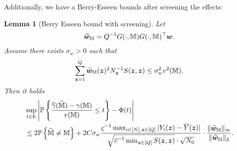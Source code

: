 \documentclass[12pt]{article}
\newtheorem{lemma}{Lemma}
\begin{document}
Additionally, we have a Berry-Esseen bounds after screening the effects:

\begin{lemma}[Berry Esseen bound with  screening]\label{lem:tail-perfect-ms} Let 
\begin{align}\label{eqn:tw}
\widetilde{{\boldsymbol{w}}}_{{\mathbb{M}}} = Q^{-1}G(\cdot,{\mathbb{M}})G(\cdot,{\mathbb{M}})^\top{\boldsymbol{w}}.
\end{align}
Assume there exists $\sigma_w>0$ such that
\begin{align}\label{eqn:nondegenerate-var-tw}
    \sum_{{\boldsymbol{z}}=1}^Q \widetilde{{\boldsymbol{w}}}_{{\mathbb{M}}}({\boldsymbol{z}})^2 N_{{\boldsymbol{z}}}^{-1} S({\boldsymbol{z}},{\boldsymbol{z}}) \le \sigma_w^2 v^2({\mathbb{M}}).
\end{align}
Then it holds
\begin{align}\label{eqn:tail-perfect-ms}
    &\sup_{t\in{\mathbb{R}}}\left|{{\mathbb{P}}\left\{\frac{{\widehat{\gamma}}(\widehat{{\mathbb{M}}})-\gamma({\mathbb{M}})}{v({\mathbb{M}})} \le t\right\}} - \Phi(t)\right| \notag\\
    &\le 2{{\mathbb{P}}\left\{\widehat{{\mathbb{M}}}\neq {\mathbb{M}}\right\}} +  2C\sigma_w   \frac{\underline{c}^{-1} \max_{i\in[N],{\boldsymbol{z}}\in[Q]}|Y_i({\boldsymbol{z}})-\overline{Y}({\boldsymbol{z}})|}{\sqrt{\overline{c}^{-1} \min_{{\boldsymbol{z}}\in[Q]} S({\boldsymbol{z}},{\boldsymbol{z}})}\cdot \sqrt{N_0}}\cdot  \frac{\|\widetilde{{\boldsymbol{w}}}_{{\mathbb{M}}}\|_\infty}{\|\widetilde{{\boldsymbol{w}}}_{{\mathbb{M}}}\|_2} .
\end{align}
\end{lemma}
\end{document}
